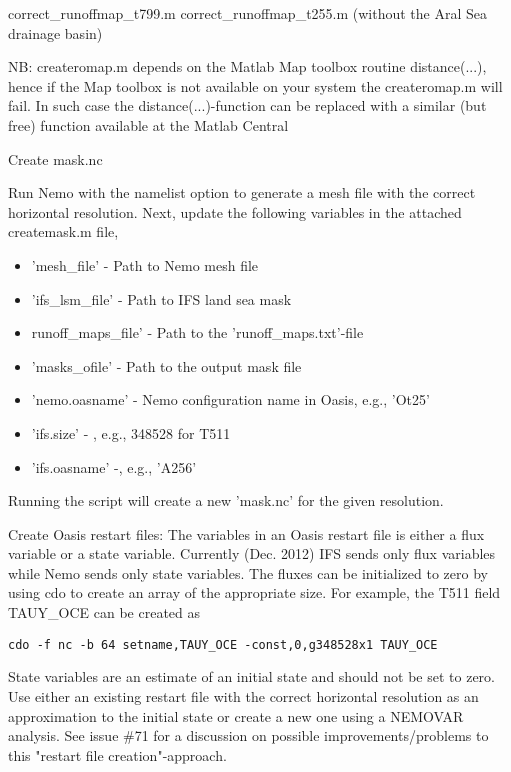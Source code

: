     correct_runoffmap_t799.m
    correct_runoffmap_t255.m (without the Aral Sea drainage basin)
\fi

NB: createromap.m depends on the Matlab Map toolbox routine distance(...), hence if the Map toolbox is not available on your system the createromap.m will fail. In such case the distance(...)-function can be replaced with a similar (but free) function available at the Matlab Central

Create mask.nc

Run Nemo with the namelist option  to generate a mesh file with the correct horizontal resolution. Next, update the following variables in the attached createmask.m file,

\begin{itemize}
  \item 'mesh\_file' - Path to Nemo mesh file
  \item 'ifs\_lsm\_file' - Path to IFS land sea mask
  \item runoff\_maps\_file' - Path to the 'runoff\_maps.txt'-file
  \item 'masks\_ofile' - Path to the output mask file
  \item 'nemo.oasname' - Nemo configuration name in Oasis, e.g., 'Ot25'
  \item 'ifs.size' - , e.g., 348528 for T511
  \item 'ifs.oasname' -, e.g., 'A256' 
\end{itemize}

Running the script will create a new 'mask.nc' for the given resolution.

Create Oasis restart files:
The variables in an Oasis restart file is either a flux variable or a state variable. Currently (Dec. 2012) IFS sends only flux variables while Nemo sends only state variables. The fluxes can be initialized to zero by using cdo to create an array of the appropriate size. For example, the T511 field TAUY\_OCE can be created as

\begin{verbatim}
cdo -f nc -b 64 setname,TAUY_OCE -const,0,g348528x1 TAUY_OCE
\end{verbatim}


State variables are an estimate of an initial state and should not be set to zero. Use either an existing restart file with the correct horizontal resolution as an approximation to the initial state or create a new one using a NEMOVAR analysis. See issue \#71 for a discussion on possible improvements/problems to this "restart file creation"-approach.


